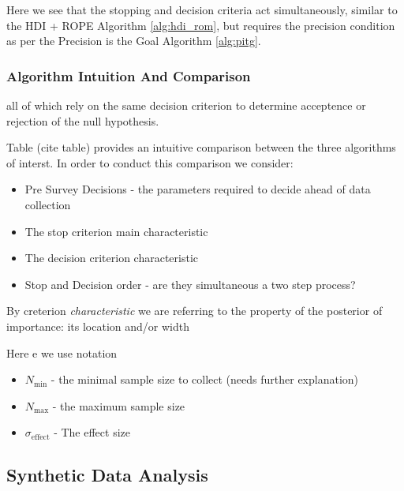 Here we see that the stopping and decision criteria act simultaneously, similar to the HDI + ROPE Algorithm \ref{alg:hdi_rom},
but requires the precision condition as per the Precision is the Goal Algorithm \ref{alg:pitg}.

\subsubsection{Algorithm Intuition And Comparison}
all of which rely on the same decision criterion to determine acceptence
or rejection of the null hypothesis.


Table (cite table) provides an intuitive comparison between the three algorithms of interst.
In order to conduct this comparison we consider:
\begin{itemize}
    \item Pre Survey Decisions - the parameters required to decide ahead of data
    collection
    \item The stop criterion main characteristic 
    \item The decision criterion characteristic
    \item Stop and Decision order - are they simultaneous a two step process?
\end{itemize}
By creterion {\it characteristic} we are referring to the property of the posterior of
importance: its location and/or width



   
Here e we use notation

  \begin{itemize}
        \item $N_\mathrm{min}$ - the minimal sample size to collect (needs further explanation)
        \item $N_\mathrm{max}$ - the maximum sample size
        \item $\sigma_\mathrm{effect}$ - The effect size
         
  \end{itemize}


\subsection{Synthetic Data Analysis}